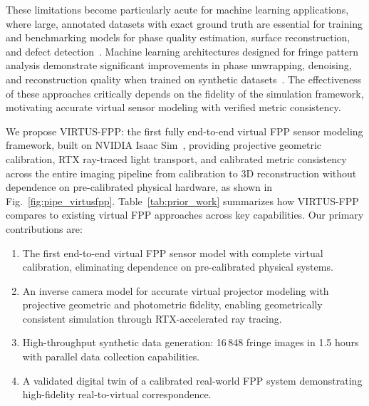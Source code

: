 \documentclass[journal,twoside,web]{ieeecolor}
\begin{document}
These limitations become particularly acute for machine learning applications, where large,
annotated datasets with exact ground truth are essential for training and benchmarking
models for phase quality estimation, surface reconstruction, and defect
detection~\cite{zuo2022deep}.
Machine learning architectures designed for fringe pattern analysis demonstrate significant
improvements in phase unwrapping, denoising, and reconstruction quality when trained on
synthetic datasets~\cite{zheng2020fringe,wang2022deepspatialphase}.
The effectiveness of these approaches critically depends on the fidelity of the simulation
framework, motivating accurate virtual sensor modeling with verified metric consistency.

We propose VIRTUS-FPP: the first fully end-to-end virtual FPP sensor modeling framework,
built on NVIDIA Isaac Sim~\cite{isaacsim_docs}, providing projective geometric calibration,
RTX ray-traced light transport, and calibrated metric consistency across the entire imaging
pipeline from calibration to 3D reconstruction without dependence on pre-calibrated physical hardware, as shown in Fig.~\ref{fig:pipe_virtusfpp}.
Table~\ref{tab:prior_work} summarizes how VIRTUS-FPP compares to existing virtual FPP
approaches across key capabilities.
Our primary contributions are:
\begin{enumerate}
    \item The first end-to-end virtual FPP sensor model with complete virtual calibration,
          eliminating dependence on pre-calibrated physical systems.
    \item An inverse camera model for accurate virtual projector modeling with projective
          geometric and photometric fidelity, enabling geometrically consistent simulation
          through RTX-accelerated ray tracing.
    \item High-throughput synthetic data generation: 16\,848       fringe images in 1.5 hours with parallel data            collection capabilities.
    \item A validated digital twin of a calibrated real-world FPP system demonstrating
          high-fidelity real-to-virtual correspondence.
\end{enumerate}
\end{document}

